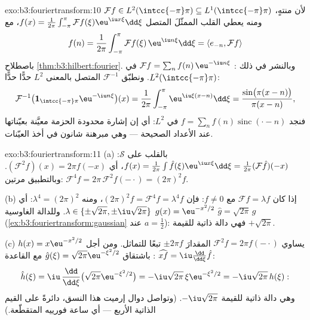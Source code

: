 \begin{solution}{exo:b3:fouriertransform:10}
$\mathcal Ff \in L^2(\intcc{-\pi}\pi) \subseteq
L^1(\intcc{-\pi}\pi)$
لأن  منتهٍ، ومنه يعطي
القلب الممثّلَ المتصل
$f(x) =
\frac1{2\pi}\int_{-\pi}^\pi\mathcal Ff(\xi)\eu^{\iu
x\xi}\dd\xi$،
مع
\[
f(n) = \frac1{2\pi}\int_{-\pi}^{\pi}\mathcal
Ff(\xi)\,\eu^{\iu n\xi}\dd\xi = \langle e_{-n}, \mathcal
Ff\rangle
\]
باصطلاح \cref{thm:b3:hilbert:fourier}. وبالنشر في ذلك : $\mathcal Ff = \sum_nf(n)\,\eu^{-\iu
n\xi}$ في
$L^2(\intcc{-\pi}\pi)$. ونطبّق $\mathcal F^{-1}$ المتصل بالمعنى $L^2$ حدًّا حدًّا:
\[
\mathcal F^{-1}\bigl(\mathbf
1_{\intcc{-\pi}\pi}\eu^{-\iu n\xi}\bigr)(x)
= \frac1{2\pi}\int_{-\pi}^{\pi}\eu^{\iu\xi(x - n)}\dd\xi
= \frac{\sin\bigl(\pi(x-n)\bigr)}{\pi(x - n)} ,
\]
فنجد $f = \sum_nf(n)\operatorname{sinc}(\cdot - n)$ في $L^2$: أي إن إشارة محدودة الحزمة معيَّنة
بعيّناتها عند الأعداد الصحيحة --- وهي مبرهنة شانون في أخذ
العيّنات.
\end{solution}

\begin{solution}{exo:b3:fouriertransform:11}
(a) بالقلب على $\mathcal S$: $f(x) =
\frac1{2\pi}\int\hat f(\xi)\eu^{\iu x\xi}\dd\xi =
\frac1{2\pi}(\mathcal F\hat f)(-x)$، أي $(\mathcal
F^2f)(x) = 2\pi f(-x)$. وبالتطبيق
مرتين: $\mathcal F^4f =
2\pi\,\mathcal F^2f(-\cdot) = (2\pi)^2f$.

(b) إذا كان $\mathcal Ff = \lambda f$ مع $f \neq 0$: فإن $(2\pi)^2f = \mathcal F^4f = \lambda^4f$، ومنه $\lambda^4 =
(2\pi)^2$:
أي $\lambda \in \{\pm\sqrt{2\pi},
\pm\iu\sqrt{2\pi}\}$. وللدالة الغاوسية $g(x) = \eu^{-x^2/2}$
$\hat g = \sqrt{2\pi}\,g$
(\cref{ex:b3:fouriertransform:gaussian} عند $a = \frac12$): فهي دالة ذاتية للقيمة
$+\sqrt{2\pi}$.

(c) يساوي $\mathcal F^2f = 2\pi f(-\cdot)$ المقدارَ $\pm2\pi f$ تبعًا للتماثل. ومن أجل
$h(x) = x\eu^{-x^2/2}$: باشتقاق $\hat g(\xi) = \sqrt{2\pi}\eu^{-\xi^2/2}$ مع القاعدة $\widehat{xf} = \iu\frac{\dd}{\dd\xi}\hat f$:
\[
\hat h(\xi) = \iu\,\frac{\dd}{\dd\xi}\bigl(\sqrt{2\pi}
\eu^{-\xi^2/2}\bigr) = -\iu\sqrt{2\pi}\,\xi\eu^{-\xi^2/2}
= -\iu\sqrt{2\pi}\,h(\xi) :
\]
وهي دالة ذاتية للقيمة $-\iu\sqrt{2\pi}$. (وتواصل دوال إرميت هذا النسق،
دائرةً على القيم الذاتية الأربع --- أي ساعة فورييه المتقطّعة.)

\end{solution}

